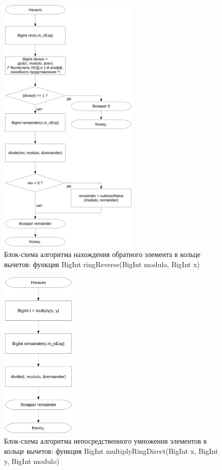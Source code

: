 \documentclass[a4paper,12pt]{article} %
\begin{document}
\begin{figure}[ht]
	\centering
	\includegraphics[width=0.6\textwidth]{lr5_ringReverse.pdf}
	\caption{
		Блок-схема алгоритма нахождения обратного элемента в кольце вычетов:
		функция BigInt ringReverse(BigInt modulo, BigInt x)
	}
	\label{bs_reverse}
\end{figure}

\begin{figure}[ht]
	\centering
	\includegraphics[width=0.32\textwidth]{lr5_multiplyRingDirect.pdf}
	\caption{
		Блок-схема алгоритма непосредственного умножения элементов в кольце вычетов:
		функция BigInt multiplyRingDirect(BigInt x, BigInt y, BigInt modulo)
	}
	\label{bs_multiply_direct}
\end{figure}
\end{document}
